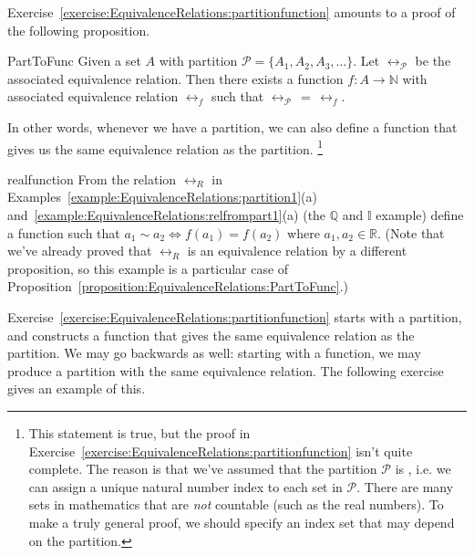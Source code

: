 Exercise~\ref{exercise:EquivalenceRelations:partitionfunction} amounts to a proof of the following proposition.     

\begin{prop}{PartToFunc}
Given a set $A$ with partition $\mathcal{P}=\{A_1, A_2, A_3, \ldots \}$. 
Let $\rel_{\mathcal{P}}$ be the associated equivalence relation. 
Then there exists a function $f:A \rightarrow \mathbb{N}$ with associated equivalence relation $\rel_f$ such that 
$\rel_{\mathcal{P}} \, = \, \rel_{f}$.
\end{prop}

In other words, whenever we have a partition, we can also define a function that gives us the same equivalence relation as the partition.
\footnote{This statement is true, but the proof in Exercise~\ref{exercise:EquivalenceRelations:partitionfunction} isn't quite complete. The reason is that we've assumed that the partition $\mathcal{P}$ is , i.e. we can assign a unique natural number index to each set in $\mathcal{P}$. There are many sets in mathematics that are \emph{not} countable (such as the real numbers). To make a truly general proof, we should specify an index set that may depend on the partition.}


\begin{exercise}{realfunction}
From the relation $\rel_R$ in Examples~\ref{example:EquivalenceRelations:partition1}(a) and~\ref{example:EquivalenceRelations:relfrompart1}(a) (the $\mathbb{Q}$ and  $\mathbb{I}$ example) define a function such that $a_1 \sim a_2 \iff  f(a_1) = f(a_2)$ where $a_1, a_2 \in \mathbb{R}$.  (Note that we've already proved that $\rel_R$ is an equivalence relation by a different proposition, so this example is a particular case of Proposition~\ref{proposition:EquivalenceRelations:PartToFunc}.) 
\end{exercise}

Exercise~\ref{exercise:EquivalenceRelations:partitionfunction} starts with a partition, and constructs a function that gives the same equivalence relation as the partition.  We may go backwards as well: starting with a function, we may produce a partition with the same equivalence relation. The following exercise gives an example of this.

